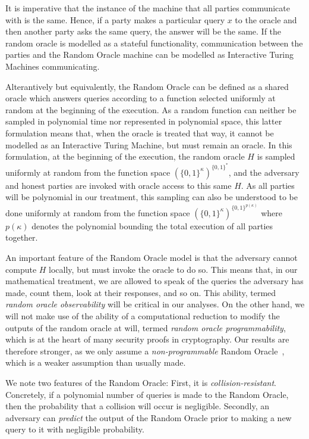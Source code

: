 It is imperative that the instance of the machine that all parties communicate
with is the same. Hence, if a party makes a particular query $x$ to the oracle
and then another party asks the same query, the answer will be the same. If the
random oracle is modelled as a stateful functionality, communication between the
parties and the Random Oracle machine can be modelled as Interactive Turing
Machines communicating.

Alterantively but equivalently, the Random Oracle can be defined as a shared
oracle which answers queries according to a function selected uniformly at
random at the beginning of the execution. As a random function can neither be
sampled in polynomial time nor represented in polynomial space, this latter
formulation means that, when the oracle is treated that way, it cannot be
modelled as an Interactive Turing Machine, but must remain an oracle. In this
formulation, at the beginning of the execution, the random oracle $H$ is sampled
uniformly at random from the function space $(\{0, 1\}^\kappa)^{\{0, 1\}^*}$,
and the adversary and honest parties are invoked with oracle access to this same
$H$. As all parties will be polynomial in our treatment, this sampling can also
be understood to be done uniformly at random from the function space $(\{0,
1\}^\kappa)^{\{0, 1\}^{p(\kappa)}}$ where $p(\kappa)$ denotes the polynomial
bounding the total execution of all parties together.

An important feature of the Random Oracle model is that the adversary cannot
compute $H$ locally, but must invoke the oracle to do so. This means that, in
our mathematical treatment, we are allowed to speak of the queries the adversary
has made, count them, look at their responses, and so on. This ability, termed
\emph{random oracle observability} will be critical in our analyses. On the
other hand, we will not make use of the ability of a computational reduction to
modify the outputs of the random oracle at will, termed \emph{random oracle
programmability}, which is at the heart of many security proofs in cryptography.
Our results are therefore stronger, as we only assume a \emph{non-programmable}
Random Oracle~\cite{nielsen2002separating,fischlin2010random}, which is a weaker
assumption than usually made.

We note two features of the Random Oracle: First, it is
\emph{collision-resistant}. Concretely, if a polynomial number of queries is
made to the Random Oracle, then the probability that a collision will occur is
negligible. Secondly, an adversary can \emph{predict} the output of the Random
Oracle prior to making a new query to it with negligible probability.
